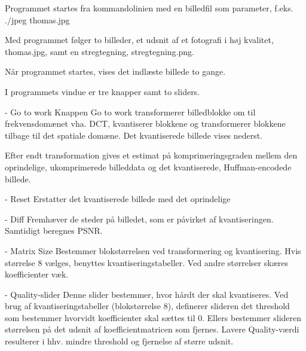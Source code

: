 Programmet startes fra kommandolinien med en billedfil som parameter, f.eks. ./jpeg thomas.jpg

Med programmet følger to billeder, et udsnit af et fotografi i høj kvalitet, thomas.jpg, samt en stregtegning, stregtegning.png.

Når programmet startes, vises det indlæste billede to gange.

I programmets vindue er tre knapper samt to sliders. 

- Go to work
Knappen Go to work transformerer billedblokke om til frekvensdomænet vha. DCT, kvantiserer blokkene og transformerer blokkene tilbage til det spatiale domæne. Det kvantiserede billede vises nederst.

Efter endt transformation gives et estimat på komprimeringsgraden mellem den oprindelige, ukomprimerede billeddata og det kvantiserede, Huffman-encodede billede.

- Reset
Erstatter det kvantiserede billede med det oprindelige

- Diff
Fremhæver de steder på billedet, som er påvirket af kvantiseringen. Samtidigt beregnes PSNR.

- Matrix Size
Bestemmer blokstørrelsen ved transformering og kvantisering. Hvis størrelse 8 vælges, benyttes kvantiseringstabeller. Ved andre størrelser skæres koefficienter væk.

- Quality-slider
Denne slider bestemmer, hvor hårdt der skal kvantiseres. Ved brug af kvantiseringstabeller (blokstørrelse 8), definerer slideren det threshold som bestemmer hvorvidt koefficienter skal sættes til 0. Ellers bestemmer slideren størrelsen på det udsnit af koefficientmatricen som fjernes. Lavere Quality-værdi resulterer i hhv. mindre threshold og fjernelse af større udsnit.

